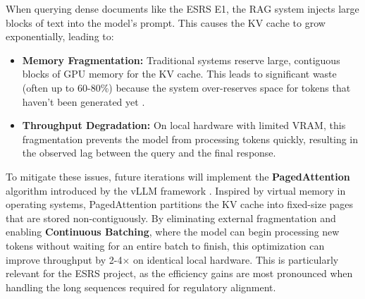 \documentclass[12pt]{article}
\begin{document}
When querying dense documents like the ESRS E1, the RAG system injects large blocks of text into the model’s prompt. This causes the KV cache to grow exponentially, leading to:
\begin{itemize}
    \item \textbf{Memory Fragmentation:} Traditional systems reserve large, contiguous blocks of GPU memory for the KV cache. This leads to significant waste (often up to 60-80\%) because the system over-reserves space for tokens that haven't been generated yet \cite{kwon2023efficientmemorymanagementlarge}.
    \item \textbf{Throughput Degradation:} On local hardware with limited VRAM, this fragmentation prevents the model from processing tokens quickly, resulting in the observed lag between the query and the final response.
\end{itemize}

To mitigate these issues, future iterations will implement the \textbf{PagedAttention} algorithm introduced by the vLLM framework \cite{kwon2023efficientmemorymanagementlarge}. Inspired by virtual memory in operating systems, PagedAttention partitions the KV cache into fixed-size pages that are stored non-contiguously. By eliminating external fragmentation and enabling \textbf{Continuous Batching}, where the model can begin processing new tokens without waiting for an entire batch to finish, this optimization can improve throughput by 2-4$\times$ on identical local hardware. This is particularly relevant for the ESRS project, as the efficiency gains are most pronounced when handling the long sequences required for regulatory alignment.
\end{document}
